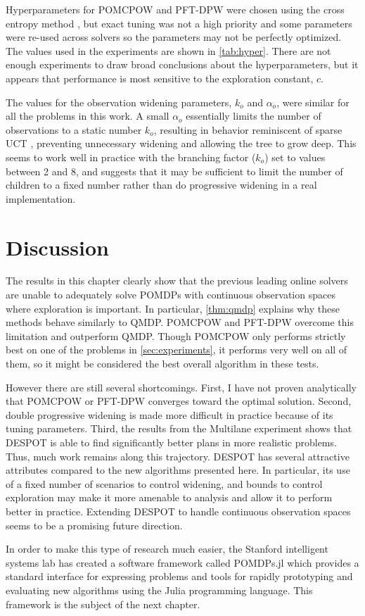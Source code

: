 Hyperparameters for POMCPOW and PFT-DPW were chosen using the cross entropy method \cite{mannor2003cross}, but exact tuning was not a high priority and some parameters were re-used across solvers so the parameters may not be perfectly optimized.
The values used in the experiments are shown in \cref{tab:hyper}. 
There are not enough experiments to draw broad conclusions about the hyperparameters, but it appears that performance is most sensitive to the exploration constant, $c$.

The values for the observation widening parameters, $k_o$ and $\alpha_o$, were similar for all the problems in this work.
A small $\alpha_o$ essentially limits the number of observations to a static number $k_o$, resulting in behavior reminiscent of sparse UCT \cite{browne2012survey}, preventing unnecessary widening and allowing the tree to grow deep.
This seems to work well in practice with the branching factor ($k_o$) set to values between \num{2} and \num{8}, and suggests that it may be sufficient to limit the number of children to a fixed number rather than do progressive widening in a real implementation.

\section{Discussion}

The results in this chapter clearly show that the previous leading online solvers are unable to adequately solve POMDPs with continuous observation spaces where exploration is important.
In particular, \cref{thm:qmdp} explains why these methods behave similarly to QMDP.
POMCPOW and PFT-DPW overcome this limitation and outperform QMDP.
Though POMCPOW only performs strictly best on one of the problems in \cref{sec:experiments}, it performs very well on all of them, so it might be considered the best overall algorithm in these tests.

However there are still several shortcomings.
First, I have not proven analytically that POMCPOW or PFT-DPW converges toward the optimal solution.
Second, double progressive widening is made more difficult in practice because of its tuning parameters.
Third, the results from the Multilane experiment shows that DESPOT is able to find significantly better plans in more realistic problems.
Thus, much work remains along this trajectory.
DESPOT has several attractive attributes compared to the new algorithms presented here.
In particular, its use of a fixed number of scenarios to control widening, and bounds to control exploration may make it more amenable to analysis and allow it to perform better in practice.
Extending DESPOT to handle continuous observation spaces seems to be a promising future direction.

In order to make this type of research much easier, the Stanford intelligent systems lab has created a software framework called POMDPs.jl which provides a standard interface for expressing problems and tools for rapidly prototyping and evaluating new algorithms using the Julia programming language.
This framework is the subject of the next chapter.
